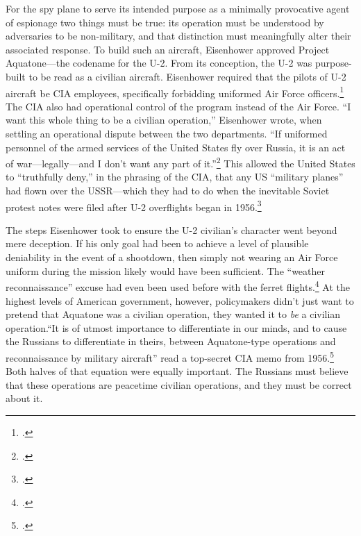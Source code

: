 \documentclass[14pt]{extarticle}
\begin{document}
For the spy plane to serve its intended purpose as a minimally provocative agent of espionage two things must be true: its operation must be understood by adversaries to be non-military, and that distinction must meaningfully alter their associated response. To build such an aircraft, Eisenhower approved Project Aquatone---the codename for the U-2. From its conception, the U-2 was purpose-built to be read as a civilian aircraft. Eisenhower required that the pilots of U-2 aircraft be CIA employees, specifically forbidding uniformed Air Force officers.\footcite[p.~33, Though many of the pilots did have Air Force backgrounds.]{lindgren_trust_2000} The CIA also had operational control of the program instead of the Air Force. \enquote{I want this whole thing to be a civilian operation,} Eisenhower wrote, when settling an operational dispute between the two departments. \enquote{If uniformed personnel of the armed services of the United States fly over Russia, it is an act of war---legally---and I don't want any part of it.}\footcite[p.~60. The original source for this quote is an \emph{OSA History} that requires codeword clearance. It is quoted here by the History Staff of the CIA.]{pedlow_central_1992} This allowed the United States to \enquote{truthfully deny,} in the phrasing of the CIA, that any US \enquote{military planes} had flown over the USSR---which they had to do when the inevitable Soviet protest notes were filed after U-2 overflights began in 1956.\footcite[p.~109]{pedlow_central_1992}

The steps Eisenhower took to ensure the U-2 civilian's character went beyond mere deception. If his only goal had been to achieve a level of plausible deniability in the event of a shootdown, then simply not wearing an Air Force uniform during the mission likely would have been sufficient. The \enquote{weather reconnaissance} excuse had even been used before with the ferret flights.\footcite[p.~45]{farquhar_aerial_2015} At the highest levels of American government, however, policymakers didn't just want to pretend that Aquatone was a civilian operation, they wanted it to \emph{be} a civilian operation.\enquote{It is of utmost importance to differentiate in our minds, and to cause the Russians to differentiate in theirs, between Aquatone-type operations and reconnaissance by military aircraft} read a top-secret CIA memo from 1956.\footcite[p.~1]{miller_suggestions_1956} Both halves of that equation were equally important. The Russians must believe that these operations are peacetime civilian operations, and they must be correct about it.
\end{document}
